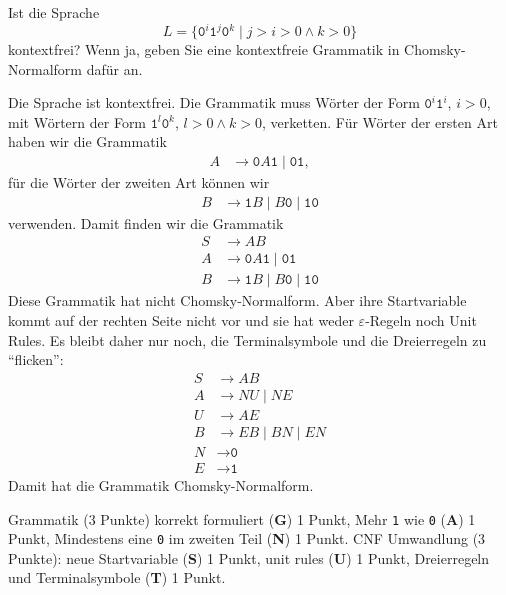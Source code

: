 Ist die Sprache
\[
L=
\{
\texttt{0}^i \texttt{1}^j\texttt{0}^k\mid  j> i>0\wedge k>0
\}
\]
kontextfrei?
Wenn ja, geben Sie eine kontextfreie Grammatik in Chomsky-Normalform dafür an.


\begin{loesung}
Die Sprache ist kontextfrei.
Die Grammatik muss Wörter der Form $\texttt{0}^i\texttt{1}^i$, $i>0$, mit
Wörtern der Form $\texttt{1}^l\texttt{0}^k$, $l>0\wedge k>0$, verketten.
Für Wörter der ersten Art haben wir die Grammatik
\begin{align*}
A&\to \texttt{0}A\texttt{1} \mid  \texttt{01},
\end{align*}
für die Wörter der zweiten Art können wir
\begin{align*}
B&\to \texttt{1} B \mid  B\texttt{0} \mid  \texttt{10}
\end{align*}
verwenden.
Damit finden wir die Grammatik
\begin{align*}
S&\to AB
\\
A&\to \texttt{0}A\texttt{1} \mid  \texttt{01}
\\ 
B&\to \texttt{1}B \mid  B\texttt{0} \mid  \texttt{10}
\end{align*}
Diese Grammatik hat nicht Chomsky-Normalform.
Aber ihre Startvariable kommt auf der rechten Seite nicht vor und
sie hat weder $\varepsilon$-Regeln noch Unit Rules.
Es bleibt daher nur noch, die Terminalsymbole und die Dreierregeln
zu ``flicken'':
\begin{align*}
S&\to AB
\\
A&\to NU \mid  NE
\\
U&\to AE
\\ 
B&\to EB \mid  BN \mid  EN
\\
N&\to \texttt{0}
\\
E&\to \texttt{1}
\end{align*}
Damit hat die Grammatik Chomsky-Normalform.
\end{loesung}

\begin{bewertung}
Grammatik (3 Punkte) korrekt formuliert ({\bf G}) 1 Punkt,
Mehr \texttt{1} wie \texttt{0} ({\bf A}) 1 Punkt,
Mindestens eine \texttt{0} im zweiten Teil ({\bf N}) 1 Punkt.
CNF Umwandlung (3 Punkte): neue Startvariable ({\bf S}) 1 Punkt,
unit rules ({\bf U}) 1 Punkt,
Dreierregeln und Terminalsymbole ({\bf T}) 1 Punkt.
\end{bewertung}

